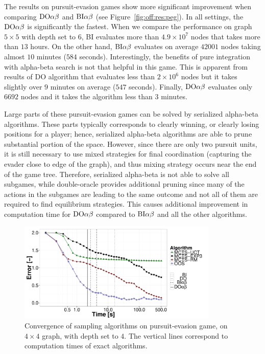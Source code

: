 The results on pursuit-evasion games show more significant improvement when comparing $\textrm{DO}\alpha\beta$ and $\textrm{BI}\alpha\beta$ (see Figure~\ref{fig:off:res:peg}). In all settings, the $\textrm{DO}\alpha\beta$ is significantly the fastest. When we compare the performance on graph $5\times5$ with depth set to $6$, \textsc{BI} evaluates more than $4.9\times10^7$ nodes that takes more than $13$ hours. On the other hand, $\textrm{BI}\alpha\beta$ evaluates on average $42001$ nodes taking almost $10$ minutes ($584$ seconds). Interestingly, the benefits of pure integration with alpha-beta search is not that helpful in this game.
This is apparent from results of \textsc{DO} algorithm that evaluates less than $2\times10^6$ nodes but it takes slightly over $9$ minutes on average ($547$ seconds). Finally, $\textrm{DO}\alpha\beta$ evaluates only $6692$ nodes and it takes the algorithm less than $3$ minutes.

Large parts of these pursuit-evasion games can be solved by serialized alpha-beta algorithms.
These parts typically corresponds to clearly winning, or clearly losing positions for a player; hence, serialized alpha-beta algorithms are able to prune substantial portion of the space.
However, since there are only two pursuit units, it is still necessary to use mixed strategies for final coordination (capturing the evader close to edge of the graph), and thus mixing strategy occurs near the end of the game tree.
Therefore, serialized alpha-beta is not able to solve all subgames, while double-oracle provides additional pruning since many of the actions in the subgames are leading to the same outcome and not all of them are required to find equilibrium strategies.
This causes additional improvement in computation time for $\textrm{DO}\alpha\beta$ compared to $\textrm{BI}\alpha\beta$ and all the other algorithms.%

\begin{figure}
\centering
\includegraphics[width=0.85\textwidth]{figures/convergence-peg.pdf}
\caption{Convergence of sampling algorithms on pursuit-evasion game, on $4\times4$ graph, with depth set to $4$. The vertical lines correspond to computation times of exact algorithms.} \label{fig:off:conv:peg}
\end{figure}

